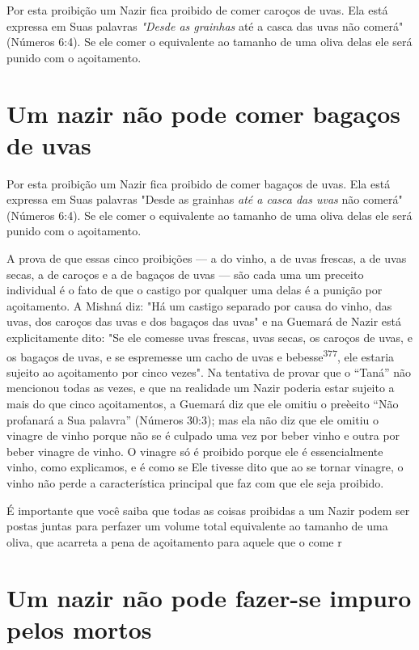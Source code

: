 Por esta proibição um Nazir fica proibido de comer caroços de uvas. Ela
está expressa em Suas palavras \emph{"Desde as grainhas} até a casca das
uvas não comerá" (Números 6:4). Se ele comer o equivalente ao tamanho de
uma oliva delas ele será punido com o açoitamento.

\section{Um nazir não pode comer bagaços de uvas}

Por esta proibição um Nazir fica proibido de comer bagaços de uvas. Ela
está expressa em Suas palavras "Desde as grainhas \emph{até a casca das
uvas} não comerá" (Números 6:4). Se ele comer o equivalente ao tamanho
de uma oliva delas ele será punido com o açoitamento.

A prova de que essas cinco proibições --- a do vinho, a de uvas
fres­cas, a de uvas secas, a de caroços e a de bagaços de uvas --- são
cada uma um
preceito individual é o fato de que o castigo por qualquer uma delas é a
puni­ção por açoitamento. A Mishná diz: "Há um castigo separado por
causa do vi­nho, das uvas, dos caroços das uvas e dos bagaços das uvas"
e na Guemará de Nazir está explicitamente dito: "Se ele comesse uvas
frescas, uvas secas, os ca­roços de uvas, e os bagaços de uvas, e se
espremesse um cacho de uvas e bebesse\textsuperscript{377}, ele estaria
sujeito ao açoitamento por cinco vezes". Na tentativa de provar que o
``Taná'' não mencionou todas as vezes, e que na realidade um Nazir poderia
estar sujeito a mais do que cinco açoitamentos, a Guemará diz que ele
omitiu o preèeito ``Não profanará a Sua palavra'' (Números 30:3); mas ela
não diz que ele omitiu o vinagre de vinho porque não se é culpado uma
vez por beber vinho e outra por beber vinagre de vinho. O vinagre só é
proibi­do porque ele é essencialmente vinho, como explicamos, e é como
se Ele ti­vesse dito que ao se tornar vinagre, o vinho não perde a
característica principal que faz com que ele seja proibido.

É importante que você saiba que todas as coisas proibidas a um Na­zir
podem ser postas juntas para perfazer um volume total equivalente ao
tama­nho de uma oliva, que acarreta a pena de açoitamento para aquele
que o co­me r

\section{Um nazir não pode fazer-se impuro pelos mortos}

